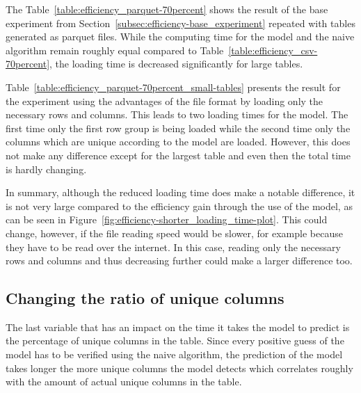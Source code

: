 The Table~\ref{table:efficiency_parquet-70percent} shows the result of the base experiment from Section~\ref{subsec:efficiency-base_experiment} repeated with tables generated as parquet files. While the computing time for the model and the naive algorithm remain roughly equal compared to Table~\ref{table:efficiency_csv-70percent}, the loading time is decreased significantly for large tables. %

Table~\ref{table:efficiency_parquet-70percent_small-tables} presents the result for the experiment using the advantages of the file format by loading only the necessary rows and columns. This leads to two loading times for the model. The first time only the first row group is being loaded while the second time only the columns which are unique according to the model are loaded. However, this does not make any difference except for the largest table and even then the total time is hardly changing.

In summary, although the reduced loading time does make a notable difference, it is not very large compared to the efficiency gain through the use of the model, as can be seen in Figure~\ref{fig:efficiency-shorter_loading_time-plot}. This could change, however, if the file reading speed would be slower, for example because they have to be read over the internet. In this case, reading only the necessary rows and columns and thus decreasing \io{} further could make a larger difference too.








\subsection{Changing the ratio of unique columns}\label{subsec:efficiency-changing_uniques}
The last variable that has an impact on the time it takes the model to predict is the percentage of unique columns in the table. Since every positive guess of the model has to be verified using the naive algorithm, the prediction of the model takes longer the more unique columns the model detects which correlates roughly with the amount of actual unique columns in the table. %

